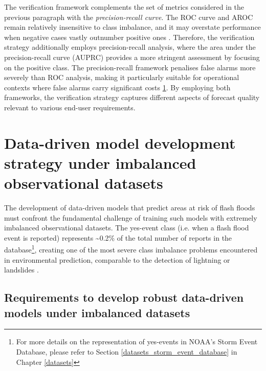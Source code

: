 \begin{figure}[htbp]
\label{fig:curve_roc_pr_examples}
\end{figure}

The  verification framework complements the set of metrics considered in the previous paragraph with the \textit{precision-recall curve}. The ROC curve and AROC remain relatively insensitive to class imbalance, and it may overstate performance when negative cases vastly outnumber positive ones \citep{Saito_2015}. Therefore, the verification strategy additionally employs precision-recall analysis, where the area under the precision-recall curve (AUPRC) provides a more stringent assessment by focusing on the positive class. The precision-recall framework penalises false alarms more severely than ROC analysis, making it particularly suitable for operational contexts where false alarms carry significant costs \ref{fig:curve_roc_pr_examples}. By employing both frameworks, the verification strategy captures different aspects of forecast quality relevant to various end-user requirements.


\section{Data-driven model development strategy 
under imbalanced observational datasets}
\label{integrated_experimental_strategy_model_development_imbalanced_data}

The development of data-driven models that predict areas at risk of flash floods must confront the fundamental challenge of training such models with extremely imbalanced observational datasets. The yes-event class (i.e. when a flash flood event is reported) represents \sim0.2\% of the total number of reports in the database\footnote{For more details on the representation of yes-events in NOAA's Storm Event Database, please refer to Section \ref{datasets_storm_event_database} in Chapter \ref{datasets}}, creating one of the most severe class imbalance problems encountered in environmental prediction, comparable to the detection of lightning \citep{Cavaiola_2024} or landslides \citep{Xu_2022, Agrawal_2017, Zhang_2022, Gupta_2023}. 

\subsection{Requirements to develop robust data-driven models under imbalanced datasets}

